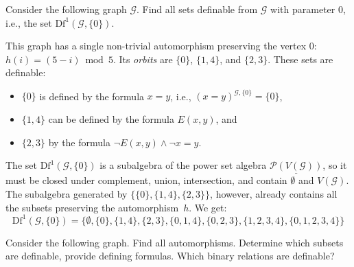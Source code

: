 \begin{example}
    Consider the following graph $\mathcal{G}$. Find all sets definable from $\mathcal{G}$ with parameter $0$, i.e., the set $\mathrm{Df}^1(\mathcal{G}, \{0\})$. 
    \begin{center}
    \end{center}
    This graph has a single non-trivial automorphism preserving the vertex $0$: $h(i) = (5 - i) \bmod 5$. Its \emph{orbits} are $\{0\}$, $\{1, 4\}$, and $\{2, 3\}$. These sets are definable:
    \begin{itemize}
        \item $\{0\}$ is defined by the formula $x = y$, i.e., $(x = y)^{\mathcal{G}, \{0\}} = \{0\}$,
        \item $\{1, 4\}$ can be defined by the formula $E(x, y)$, and
        \item $\{2, 3\}$ by the formula $\neg E(x, y) \land \neg x = y$.
    \end{itemize}
    The set $\mathrm{Df}^1(\mathcal{G}, \{0\})$ is a subalgebra of the power set algebra $\underline{\mathcal{P}(V(\mathcal{G}))}$, so it must be closed under complement, union, intersection, and contain $\emptyset$ and $V(\mathcal{G})$. The subalgebra generated by $\{\{0\}, \{1, 4\}, \{2, 3\}\}$, however, already contains all the subsets preserving the automorphism~$h$. We get:
    $$
    \mathrm{Df}^1(\mathcal{G}, \{0\}) = \{\emptyset, \{0\}, \{1, 4\}, \{2, 3\}, \{0, 1, 4\}, \{0, 2, 3\}, \{1, 2, 3, 4\}, \{0, 1, 2, 3, 4\}\}
    $$
\end{example}

\begin{exercise}
    Consider the following graph. Find all automorphisms. Determine which subsets are definable, provide defining formulas. Which binary relations are definable?
    \begin{center}
    \end{center}
\end{exercise}


